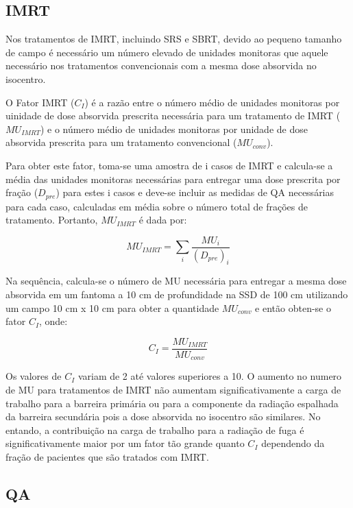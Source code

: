 \documentclass[11pt,a4paper]{article}
\begin{document}
    \subsection{IMRT}

        Nos tratamentos de IMRT, incluindo SRS e SBRT, devido ao pequeno tamanho de campo é necessário um número elevado de unidades monitoras que aquele necessário nos tratamentos convencionais com a mesma dose absorvida no isocentro. 

        O Fator IMRT ($C_I$) é a razão entre o número médio de unidades monitoras por uinidade de dose absorvida prescrita necessária para um tratamento de IMRT ($MU_{IMRT}$) e o número médio de unidades monitoras por unidade de dose absorvida prescrita para um tratamento convencional ($MU_{conv}$). 

        Para obter este fator, toma-se uma amostra de i casos de IMRT e calcula-se a média das unidades monitoras necessárias para entregar uma dose prescrita por fração ($D_{pre}$) para estes i casos e deve-se incluir as medidas de QA necessárias para cada caso, calculadas em média sobre o número total de frações de tratamento. Portanto, $MU_{IMRT}$ é dada por:

        \begin{equation}
            MU_{IMRT} = \sum_{i}\frac{MU_i}{(D_{pre})_i}
        \end{equation}
         
        Na sequência, calcula-se o número de MU necessária para entregar a mesma dose absorvida em um fantoma a 10 cm de profundidade na SSD de 100 cm utilizando um campo 10 cm x 10 cm para obter a quantidade $MU_{conv}$ e então obten-se o fator $C_I$, onde:

        \begin{equation}
            C_I = \frac{MU_{IMRT}}{MU_{conv}}
        \end{equation}

        Os valores de $C_I$ variam de 2 até valores superiores a 10.  O aumento no numero de MU para tratamentos de IMRT não aumentam significativamente a carga de trabalho para a barreira primária ou para a componente da radiação espalhada da barreira secundária pois a dose absorvida no isocentro são similares. No entando, a contribuição na carga de trabalho para a radiação de fuga é significativamente maior por um fator tão grande quanto $C_I$ dependendo da fração de pacientes que são tratados com IMRT.

    \subsection{QA}
\end{document}
